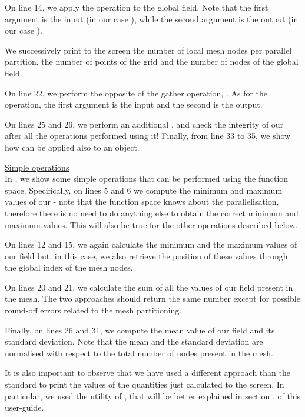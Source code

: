 \begin{description}
On line 14, we apply the  operation to the global field.
Note that the first argument is the input (in our case ),
while the second argument is the output (in our case ).

We successively print to the screen the number of local mesh nodes 
per parallel partition, the number of points of the grid and the 
number of nodes of the global field.

On line 22, we perform the opposite of the gather operation, 
. As for the  operation, the 
first argument is the input and the second is the output.

On lines 25 and 26, we perform an additional , 
and check the integrity of our  after 
all the operations performed using it! 
Finally, from line 33 to 35, we show how  
can be applied also to an  object.

%

%
%
\item \underline{Simple operations}\\[0.5em]
%
In , we show some simple operations that 
can be performed using the  function space. Specifically, 
on lines 5 and 6 we compute the minimum and maximum values of our 
 - note that the function space knows about 
the parallelisation, therefore there is no need to do anything 
else to obtain the correct minimum and maximum values. This will
also be true for the other operations described below.

On lines 12 and 15, we again calculate the minimum and the maximum 
values of our field but, in this case, we also retrieve the position 
of these values through the global index of the mesh nodes.

On lines 20 and 21, we calculate the sum of all the values of our 
field present in the mesh. The two approaches should return the 
same number except for possible round-off errors related to the 
mesh partitioning.

Finally, on lines 26 and 31, we compute the mean value of our
field and its standard deviation. Note that the mean and the 
standard deviation are normalised with respect to the total 
number of nodes present in the mesh.

It is also important to observe that we have used a different 
approach than the standard  to print the values 
of the quantities just calculated to the screen. In particular, 
we used the  utility of \Atlas, that will 
be better explained in section , of this user-guide.


\end{description}
